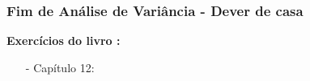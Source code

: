 \documentclass[graphics,14pt]{beamer}
\begin{document}
\begin{frame}[t,fragile=singleslide]
	\frametitle{Fim de Análise de Variância - Dever de casa}
	\textbf{Exercícios do livro \cite{Agresti2018}:}
	\begin{itemize}
		\item[-] Capítulo 12: %
	\end{itemize}
\end{frame}
\end{document}
